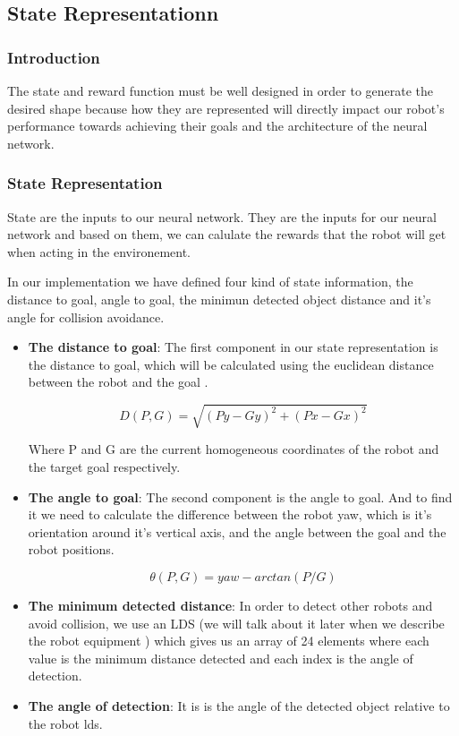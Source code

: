 \documentclass[12pt]{extarticle}
\begin{document}
\subsection{State Representationn}

\subsubsection{Introduction}
The state and reward function must be well designed in order to generate the desired shape because how they are represented will directly impact our robot's performance towards achieving their goals and the architecture of the neural network.


\subsubsection{State Representation}
State  are the inputs to our neural network. They are the inputs for our neural network and  based on them, we can  calulate  the rewards that the robot will get when acting in the environement.

In our implementation we have defined four kind  of state information, the distance to goal, angle to goal, the minimun detected object distance and it's angle for collision avoidance.



\pagebreak
\begin{itemize}
\item \textbf{The distance to goal}: 
The first component in our state representation is the distance to goal, which will be calculated using the euclidean distance  between the robot and the goal .


\[ D(P,G)=\sqrt{(Py-Gy)^2+(Px-Gx)^2}  \] 

Where P and G are the current homogeneous coordinates of the robot and the target goal respectively.

\item \textbf{The angle to goal}: 
The second component  is the angle  to goal. And to find it we need to calculate  the difference between the robot yaw, which is it's orientation around it's vertical axis, and the angle between the goal and the robot positions.


\[ \theta(P,G)=yaw-arctan(P/G)  \] 


\item \textbf{The minimum detected distance}: 
In order to detect other robots and avoid collision, we use an  LDS (we will talk about it later when we describe the robot equipment )  which gives us an array of 24 elements where each value is the minimum distance detected and each index is the angle of detection.


\item \textbf{The angle of detection}: 
It is is the angle of the detected object relative to the robot lds.



\end{itemize}
\end{document}
